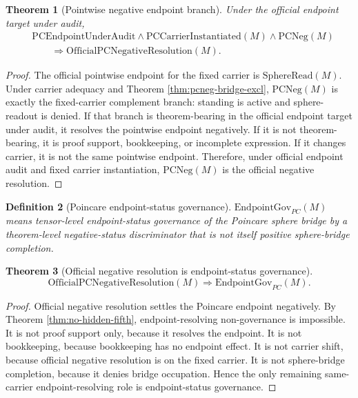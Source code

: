 \documentclass[11pt]{article}
\newtheorem{theorem}{Theorem}[section]
\newtheorem{definition}[theorem]{Definition}
\newcommand{\SphereRead}{\mathrm{SphereRead}}
\newcommand{\PCEndpoint}{\mathrm{PCEndpointUnderAudit}}
\newcommand{\PCCarrierInst}{\mathrm{PCCarrierInstantiated}}
\newcommand{\OfficialPCNegativeResolution}{\mathrm{OfficialPCNegativeResolution}}
\newcommand{\PCNeg}{\mathrm{PCNeg}}
\newcommand{\EndpointGov}{\mathrm{EndpointGov}_{PC}}
\begin{document}
\begin{theorem}[Pointwise negative endpoint branch]\label{thm:pcneg-official-negative}
Under the official endpoint target under audit,
\[
\begin{aligned}
&\PCEndpoint\wedge\PCCarrierInst(M)\wedge\PCNeg(M)\\
&\qquad\Rightarrow\OfficialPCNegativeResolution(M).
\end{aligned}
\]
\end{theorem}
\begin{proof}
The official pointwise endpoint for the fixed carrier is \(\SphereRead(M)\). Under carrier adequacy and Theorem \ref{thm:pcneg-bridge-excl}, \(\PCNeg(M)\) is exactly the fixed-carrier complement branch: standing is active and sphere-readout is denied. If that branch is theorem-bearing in the official endpoint target under audit, it resolves the pointwise endpoint negatively. If it is not theorem-bearing, it is proof support, bookkeeping, or incomplete expression. If it changes carrier, it is not the same pointwise endpoint. Therefore, under official endpoint audit and fixed carrier instantiation, \(\PCNeg(M)\) is the official negative resolution.
\end{proof}

\begin{definition}[Poincare endpoint-status governance]
\(\EndpointGov(M)\) means tensor-level endpoint-status governance of the Poincare sphere bridge by a theorem-level negative-status discriminator that is not itself positive sphere-bridge completion.
\end{definition}

\begin{theorem}[Official negative resolution is endpoint-status governance]\label{thm:official-negative-governance}
\[
\OfficialPCNegativeResolution(M)\Rightarrow\EndpointGov(M).
\]
\end{theorem}
\begin{proof}
Official negative resolution settles the Poincare endpoint negatively. By Theorem \ref{thm:no-hidden-fifth}, endpoint-resolving non-governance is impossible. It is not proof support only, because it resolves the endpoint. It is not bookkeeping, because bookkeeping has no endpoint effect. It is not carrier shift, because official negative resolution is on the fixed carrier. It is not sphere-bridge completion, because it denies bridge occupation. Hence the only remaining same-carrier endpoint-resolving role is endpoint-status governance.
\end{proof}
\end{document}
